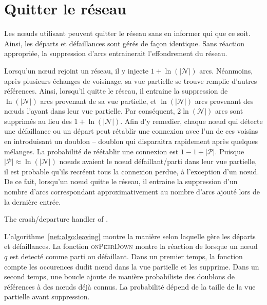 \section{Quitter le réseau}
\label{net:sec:leaving}

Les nœuds utilisant \SPRAY peuvent quitter le réseau sans en informer qui que ce
soit. Ainsi, les départs et défaillances sont gérés de façon identique. Sans
réaction appropriée, la suppression d'arcs entrainerait l'effondrement du
réseau.

Lorsqu'un nœud rejoint un réseau, il y injecte $1+\ln(|\mathcal{N}|)$
arcs. Néanmoins, après plusieurs échanges de voisinage, sa vue partielle se
trouve remplie d'autres références. Ainsi, lorsqu'il quitte le réseau, il
entraine la suppression de $\ln(|\mathcal{N}|)$ arcs provenant de sa vue
partielle, et $\ln(|\mathcal{N}|)$ arcs provenant des nœuds l'ayant dans leur
vue partielle. Par conséquent, $2\ln(\mathcal{N}|)$ arcs sont supprimés au lieu
des $1+\ln(|\mathcal{N}|)$. Afin d'y remedier, chaque nœud qui détecte une
défaillance ou un départ peut rétablir une connexion avec l'un de ces voisins en
introduisant un doublon -- doublon qui disparaitra rapidement après quelques
mélanges. La probabilité de réétablir une connexion est
$1-1\div{|\mathcal{P}|}$. Puisque ${|\mathcal{P}|}\approx \ln(|\mathcal{N}|)$
nœuds avaient le nœud défaillant/parti dans leur vue partielle, il est probable
qu'ils recréent tous la connexion perdue, à l'exception d'un nœud. De ce fait,
lorsqu'un nœud quitte le réseau, il entraine la suppression d'un nombre d'arcs
correspondant approximativement au nombre d'arcs ajouté lors de la dernière
entrée.

\begin{algorithm}[h]
  
  \caption{\label{net:algo:leaving}The crash/departure handler of \SPRAY.}
\end{algorithm}

L'algorithme~\ref{net:algo:leaving} montre la manière selon laquelle \SPRAY gère
les départs et défaillances. La fonction \textsc{onPeerDown} montre la réaction
de \SPRAY lorsque un nœud $q$ est detecté comme parti ou défaillant. Dans un
premier temps, la fonction compte les occurences dudit nœud dans la vue
partielle et les supprime. Dans un second temps, une boucle ajoute de manière
probabiliste des doublons de références à des nœuds déjà connus. La probabilité
dépend de la taille de la vue partielle avant suppression.

